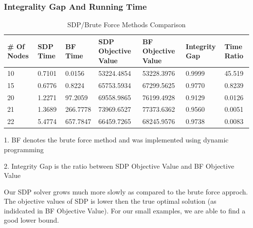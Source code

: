 \documentclass{article}
\begin{document}
\subsubsection{Integrality Gap And Running Time}
\begin{table}[!ht]
\begin{threeparttable}
\caption{SDP/Brute Force Methods Comparison}
\begin{tabular}{|l|l|l|l|l|l|l|}
\hline
\# Of Nodes & SDP  Time & BF Time  & SDP Objective Value & BF Objective Value & Integrity Gap & Time Ratio \\
\hline
10          & 0.7101    & 0.0156   & 53224.4854          & 53228.3976         & 0.9999        & 45.519     \\
15          & 0.6776    & 0.8224   & 65753.5934          & 67299.5625         & 0.9770        & 0.8239     \\
20          & 1.2271    & 97.2059  & 69558.9865          & 76199.4928         & 0.9129        & 0.0126     \\
21          & 1.3689    & 266.7778 & 73969.6527          & 77373.6362         & 0.9560        & 0.0051     \\
22          & 5.4774    & 657.7847 & 66459.7265          & 68245.9576         & 0.9738        & 0.0083     \\
 \hline
\end{tabular}
\begin{tablenotes}
      \small
      \item 1. BF denotes the brute force method and was implemented using dynamic programming
      \item 2. Integrity Gap is the ratio between SDP Objective Value and BF Objective Value
    \end{tablenotes}
\end{threeparttable}
\end{table}

Our SDP solver grows much more slowly as compared to the brute force approch. The objective values of 
SDP is lower then the true optimal solution (as indidcated in BF Objective Value). For our small examples, we
are able to find a good lower bound. 
\end{document}

